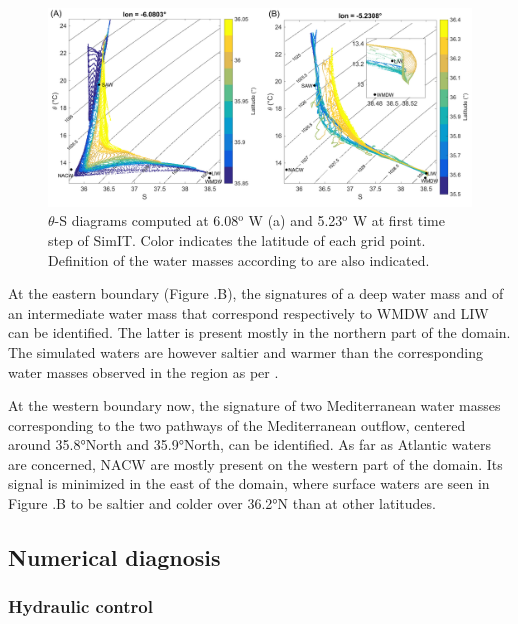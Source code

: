 \begin{figure}[!h]
        \includegraphics[width=\textwidth]{./GBR3D/WM_ini_IES.png}
        \caption[$\theta$-S diagrams at first time step of SimIT.]{$\theta$-S diagrams computed at 6.08$^\text{o}$ W (a) and 5.23$^\text{o}$ W at first time step of SimIT. Color indicates the latitude of each grid point. Definition of the water masses according to \citet{Naranjo2014} are also indicated.}
        \label{Fig_Ini_WM3D}
\end{figure}

At the eastern boundary (Figure .B), the signatures of a deep water mass and of an intermediate water mass that correspond respectively to WMDW and LIW can be identified. The latter is present mostly in the northern part of the domain. The simulated waters are however saltier and warmer than the corresponding water masses observed in the region as per \citet{Naranjo2014}.

At the western boundary now, the signature of two Mediterranean water masses corresponding to the two pathways of the Mediterranean outflow, centered around 35.8°North and 35.9°North, can be identified.
As far as Atlantic waters are concerned, NACW are mostly present on the western part of the domain. Its signal is minimized in the east of the domain, where surface waters are seen in Figure .B to be saltier and colder over 36.2°N than at other latitudes.


\subsection{Numerical diagnosis}
\label{PartDiag3D}

\subsubsection{Hydraulic control}
\label{sectiondiagControl}

